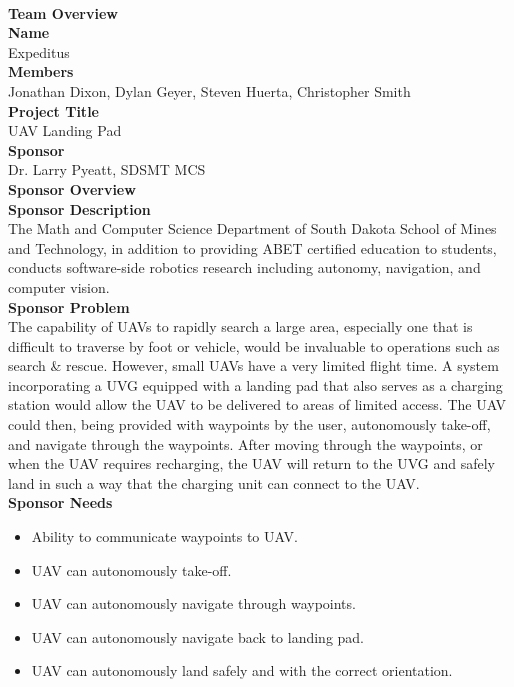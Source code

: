 \\
\Large{\textbf{Team Overview}}
\\[-3mm]\noindent\makebox[\linewidth]{\rule{\textwidth}{0.4pt}}
\normalsize{\textbf{Name}}
\\Expeditus
\\[3mm]
\normalsize{\textbf{Members}}
\\ Jonathan Dixon, Dylan Geyer, Steven Huerta, Christopher Smith
\\[3mm]
\normalsize{\textbf{Project Title}}
\\ UAV Landing Pad
\\[3mm]
\normalsize{\textbf{Sponsor}}
\\ Dr. Larry Pyeatt, SDSMT MCS
\\[10mm]
\Large{\textbf{Sponsor Overview}}
\\[-3mm]\noindent\makebox[\linewidth]{\rule{\textwidth}{0.4pt}}
\normalsize{\textbf{Sponsor Description}}
\\ The Math and Computer Science Department of South Dakota School of Mines and Technology, in addition to providing ABET certified education to students, conducts software-side robotics research including autonomy, navigation, and computer vision. 
\\[3mm]
\normalsize{\textbf{Sponsor Problem}}
\\ The capability of UAVs to rapidly search a large area, especially one that is difficult to traverse by foot or vehicle, would be invaluable to operations such as search \& rescue. However, small UAVs have a very limited flight time. A system incorporating a UVG equipped with a landing pad that also serves as a charging station would allow the UAV to be delivered to areas of limited access. The UAV could then, being provided with waypoints by the user, autonomously take-off, and navigate through the waypoints. After moving through the waypoints, or when the UAV requires recharging, the UAV will return to the UVG and safely land in such a way that the charging unit can connect to the UAV.
\\[3mm]
\normalsize{\textbf{Sponsor Needs}}
\begin{itemize}
\item Ability to communicate waypoints to UAV.
\item UAV can autonomously take-off.
\item UAV can autonomously navigate through waypoints.
\item UAV can autonomously navigate back to landing pad.
\item UAV can autonomously land safely and with the correct orientation.
\end{itemize}
